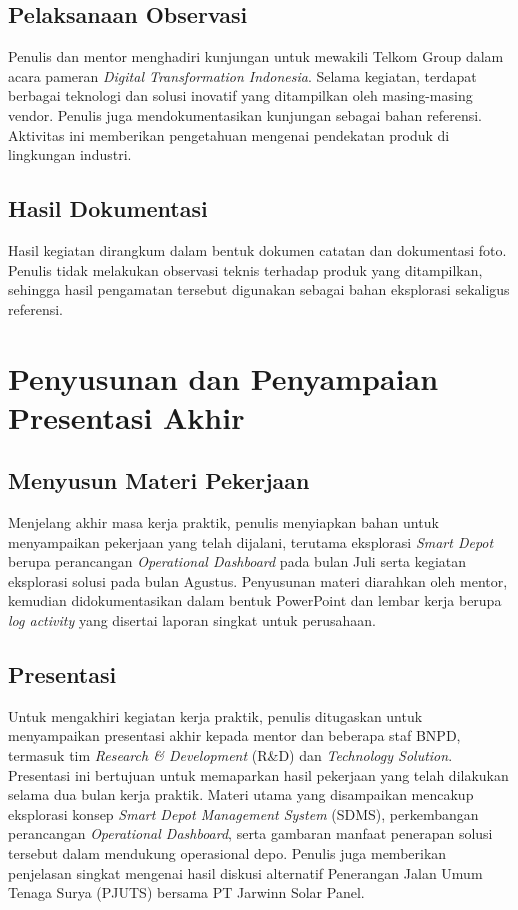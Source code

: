 \subsection{Pelaksanaan Observasi}
Penulis dan mentor menghadiri kunjungan untuk mewakili Telkom Group dalam acara pameran \textit{Digital Transformation Indonesia}. Selama kegiatan, terdapat berbagai teknologi dan solusi inovatif yang ditampilkan oleh masing-masing vendor. Penulis juga mendokumentasikan kunjungan sebagai bahan referensi. Aktivitas ini memberikan pengetahuan mengenai pendekatan produk di lingkungan industri.

\subsection{Hasil Dokumentasi}
Hasil kegiatan dirangkum dalam bentuk dokumen catatan dan dokumentasi foto. Penulis tidak melakukan observasi teknis terhadap produk yang ditampilkan, sehingga hasil pengamatan tersebut digunakan sebagai bahan eksplorasi sekaligus referensi.

\section{Penyusunan dan Penyampaian Presentasi Akhir}
\subsection{Menyusun Materi Pekerjaan}
Menjelang akhir masa kerja praktik, penulis menyiapkan bahan untuk menyampaikan pekerjaan yang telah dijalani, terutama eksplorasi \textit{Smart Depot} berupa perancangan \textit{Operational Dashboard} pada bulan Juli serta kegiatan eksplorasi solusi pada bulan Agustus. Penyusunan materi diarahkan oleh mentor, kemudian didokumentasikan dalam bentuk PowerPoint dan lembar kerja berupa \textit{log activity} yang disertai laporan singkat untuk perusahaan.

\subsection{Presentasi}
Untuk mengakhiri kegiatan kerja praktik, penulis ditugaskan untuk menyampaikan presentasi akhir kepada mentor dan beberapa staf BNPD, termasuk tim \textit{Research \& Development} (R\&D) dan \textit{Technology Solution}. Presentasi ini bertujuan untuk memaparkan hasil pekerjaan yang telah dilakukan selama dua bulan kerja praktik. Materi utama yang disampaikan mencakup eksplorasi konsep \textit{Smart Depot Management System} (SDMS), perkembangan perancangan \textit{Operational Dashboard}, serta gambaran manfaat penerapan solusi tersebut dalam mendukung operasional depo. Penulis juga memberikan penjelasan singkat mengenai hasil diskusi alternatif Penerangan Jalan Umum Tenaga Surya (PJUTS) bersama PT Jarwinn Solar Panel.

